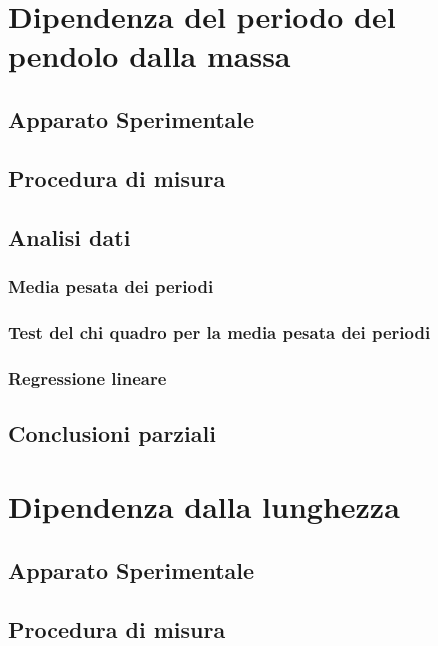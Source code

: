 \documentclass[11pt, twoside, a4paper]{article}
\begin{document}

\newpage

\newpage


\section{Dipendenza del periodo del pendolo dalla massa}
\label{dipendenza_massa}
%
	\subsection{Apparato Sperimentale}
	
	\subsection{Procedura di misura}
	
	\subsection{Analisi dati}
	
		\subsubsection{Media pesata dei periodi}
		
		\subsubsection{Test del chi quadro per la media pesata dei periodi}
		
		\subsubsection{Regressione lineare}
		
	\subsection{Conclusioni parziali}
	
\newpage
\section{Dipendenza dalla lunghezza}
	\subsection{Apparato Sperimentale}
	
	\subsection{Procedura di misura}
	
\end{document}
